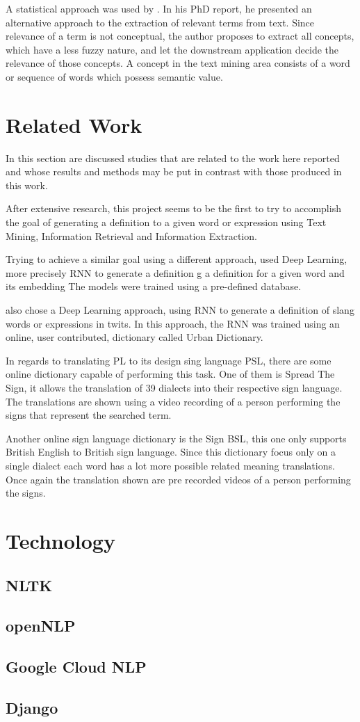 A statistical approach was used by \textcite{ventura_2014}.
In his PhD report, he presented an alternative approach to the extraction of relevant terms from text.
Since relevance of a term is not conceptual, the author proposes to extract all concepts, which have a less fuzzy nature, and let the downstream application decide the relevance of those concepts.
A concept in the text mining area consists of a word or sequence of words which possess semantic value.

\section{Related Work}

In this section are discussed studies that are related to the work here reported and whose results and methods may be put in contrast with those produced in this work.

After extensive research, this project seems to be the first to try to accomplish the goal of generating a definition to a given word or expression using Text Mining, Information Retrieval and Information Extraction.

Trying to achieve a similar goal using a different approach, \textcite{noraset_2016} used Deep Learning, more precisely \gls{RNN} to generate a definition g a definition for a given word and its embedding
The models were trained using a pre-defined database.

\textcite{ni_2017} also chose a Deep Learning approach, using \gls{RNN} to generate a definition of slang words or expressions in twits.
In this approach, the \gls{RNN} was trained using an online, user contributed, dictionary called Urban Dictionary.

In regards to translating PL to its design sing language PSL, there are some online dictionary capable of performing this task.
One of them is Spread The Sign, it allows the translation of 39 dialects into their respective sign language.
The translations are shown using a video recording of a person performing the signs that represent the searched term.

Another online sign language dictionary is the Sign BSL, this one only supports British English to British sign language.
Since this dictionary focus only on a single dialect each word has a lot more possible related meaning translations.
Once again the translation shown are pre recorded videos of a person performing the signs.

\section{Technology}

\subsection{NLTK}

\subsection{openNLP}

\subsection{Google Cloud NLP}

\subsection{Django}
